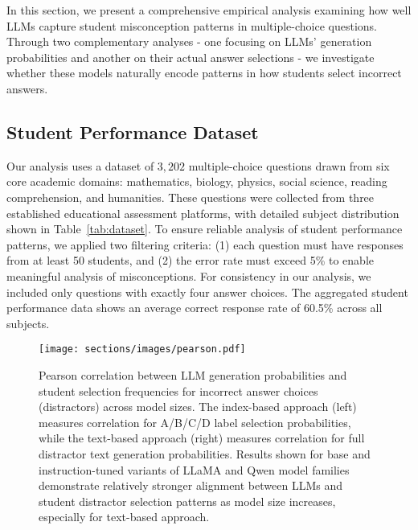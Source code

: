 

In this section, we present a comprehensive empirical analysis examining how well LLMs capture student misconception patterns in multiple-choice questions. Through two complementary analyses - one focusing on LLMs' generation probabilities and another on their actual answer selections - we investigate whether these models naturally encode patterns in how students select incorrect answers.

\subsection{Student Performance Dataset}

Our analysis uses a dataset of $3,202$ multiple-choice questions drawn from six core academic domains: mathematics, biology, physics, social science, reading comprehension, and humanities. 
These questions were collected from three established educational assessment platforms, with detailed subject distribution shown in Table~\ref{tab:dataset}. To ensure reliable analysis of student performance patterns, we applied two filtering criteria: (1) each question must have responses from at least 50 students, and (2) the error rate must exceed 5\% to enable meaningful analysis of misconceptions. For consistency in our analysis, we included only questions with exactly four answer choices. The aggregated student performance data shows an average correct response rate of 60.5\% across all subjects. 



\begin{figure}[t!]
    \centering
        \texttt{[image: sections/images/pearson.pdf]} 
    \caption{
    Pearson correlation between LLM generation probabilities and student selection frequencies for incorrect answer choices (distractors) across model sizes. The index-based approach (left) measures correlation for A/B/C/D label selection probabilities, while the text-based approach (right) measures correlation for full distractor text generation probabilities. Results shown for base and instruction-tuned variants of LLaMA and Qwen model families demonstrate relatively stronger alignment between LLMs and student distractor selection patterns as model size increases, especially for text-based approach.
    }
    \label{img:rq1_alignment_size}
\end{figure}

